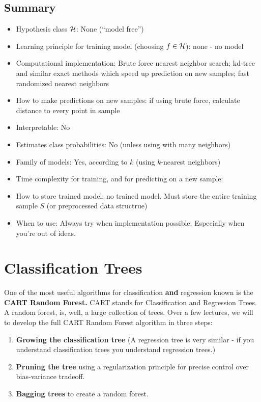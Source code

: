 \subsection{Summary}
\begin{itemize}
  \item Hypothesis class $\mathcal{H}$: None (``model free'')
  \item Learning principle for training model (choosing $f\in\mathcal{H}$): none - no model
  \item Computational implementation:
    Brute force nearest neighbor search; 
    kd-tree and similar exact methods which speed up prediction on new samples; 
    fast randomized nearest neighbors 
  \item How to make predictions on new samples: if using brute force, calculate
    distance to every point in sample 
  \item Interpretable: No
    \item Estimates class probabilities: No (unless using with many neighbors)
    \item Family of models: Yes, according to $k$ (using $k$-nearest neighbors)
     \item Time complexity for training, and for predicting on a new sample:
     \item How to store trained model: no trained model. Must store the entire
       training sample $S$ (or preprocessed data structrue)
     \item When to use: Always try when implementation possible. Especially when you're out of ideas.
\end{itemize}


\section{Classification Trees}
 

One of the most useful algorithms for classification {\bf and} regression known is the {\bf CART Random
Forest.} CART stands for Classification and Regression Trees. A random forest,
is, well, a large collection of trees. 
Over a few lectures, we will to develop the full CART Random
Forest algorithm in three steps:
\begin{enumerate}
  \item {\bf Growing the classification tree} (A regression tree is very similar
    - if you understand classification trees you understand regression trees.)
  \item {\bf Pruning the tree} using a regularization principle for precise control
    over bias-variance tradeoff.
  \item {\bf Bagging trees} to create a random forest.
  \end{enumerate}


